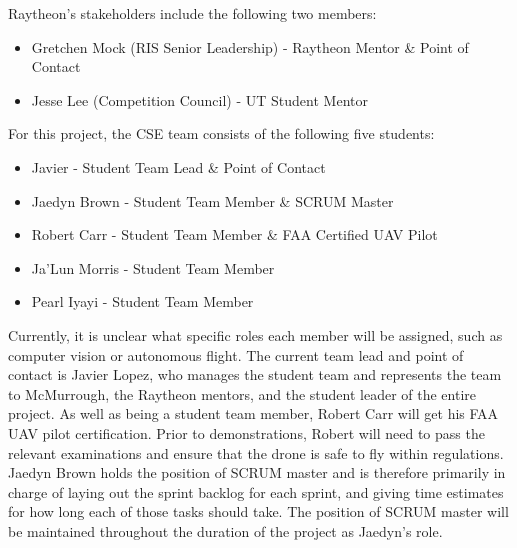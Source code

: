 
Raytheon's stakeholders include the following two members:
\begin{itemize}
    \item Gretchen Mock (RIS Senior Leadership) - Raytheon Mentor \& Point of Contact
    \item Jesse Lee (Competition Council) - UT Student Mentor
\end{itemize}
For this project, the CSE team consists of the following five students:
\begin{itemize}
    \item Javier - Student Team Lead \& Point of Contact
    \item Jaedyn Brown - Student Team Member \& SCRUM Master
    \item Robert Carr - Student Team Member \& FAA Certified UAV Pilot
    \item Ja'Lun Morris - Student Team Member
    \item Pearl Iyayi - Student Team Member
\end{itemize}
Currently, it is unclear what specific roles each member will be assigned, such as computer vision or autonomous flight. The current team lead and point of contact is Javier Lopez, who manages the student team and represents the team to McMurrough, the Raytheon mentors, and the student leader of the entire project. As well as being a student team member, Robert Carr will get his FAA UAV pilot certification. Prior to demonstrations, Robert will need to pass the relevant examinations and ensure that the drone is safe to fly within regulations. Jaedyn Brown holds the position of SCRUM master and is therefore primarily in charge of laying out the sprint backlog for each sprint, and giving time estimates for how long each of those tasks should take. The position of SCRUM master will be maintained throughout the duration of the project as Jaedyn's role.
